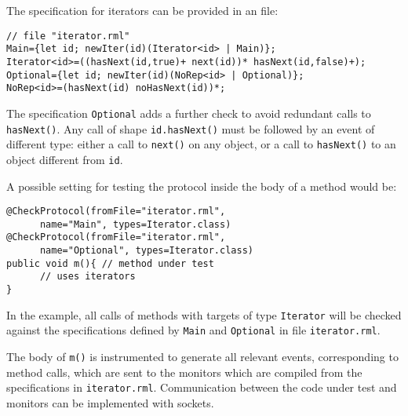 The specification for iterators can be provided in an \rml file:
\begin{lstlisting}[basicstyle=\tt\footnotesize]
// file "iterator.rml"      
Main={let id; newIter(id)(Iterator<id> | Main)};
Iterator<id>=((hasNext(id,true)+ next(id))* hasNext(id,false)+);   
Optional={let id; newIter(id)(NoRep<id> | Optional)};
NoRep<id>=(hasNext(id) noHasNext(id))*; 
\end{lstlisting}
The specification \lstinline|Optional| adds a further check to avoid redundant calls to \lstinline|hasNext()|. Any call of shape \lstinline|id.hasNext()| must be followed by an event of different type: either a call to \lstinline|next()| on any object, or a call to \lstinline|hasNext()| to an object different from \lstinline|id|.

A possible setting for testing the protocol inside the body of a method would be:
\begin{lstlisting}[basicstyle=\tt\footnotesize]
@CheckProtocol(fromFile="iterator.rml", 
      name="Main", types=Iterator.class)
@CheckProtocol(fromFile="iterator.rml", 
      name="Optional", types=Iterator.class)
public void m(){ // method under test
      // uses iterators
}
\end{lstlisting}
In the example, all calls of methods with targets of type \lstinline|Iterator| will be checked against the specifications defined by \lstinline|Main| and \lstinline|Optional| in file \lstinline|iterator.rml|.

The body of \lstinline|m()| is instrumented to generate all relevant events, corresponding to method calls, which are sent to the monitors which are compiled from the specifications in \lstinline|iterator.rml|. Communication between the code under test and monitors
can be implemented with sockets.


